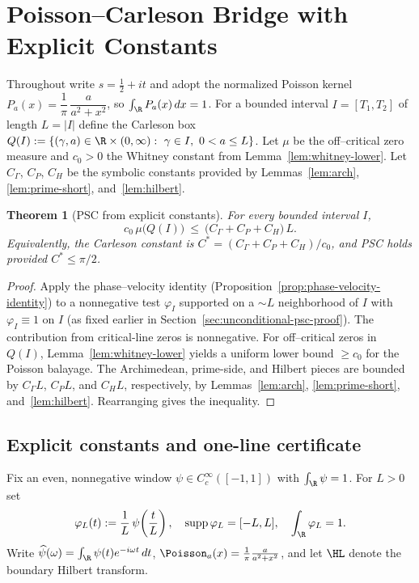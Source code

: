 \documentclass[11pt]{article}
\newtheorem{theorem}{Theorem}
\theoremstyle{remark}
\begin{document}
\section{Poisson--Carleson Bridge with Explicit Constants}\label{sec:pc-bridge}
Throughout write $s=\tfrac12+it$ and adopt the normalized Poisson kernel $P_a(x)=\dfrac{1}{\pi}\,\dfrac{a}{a^2+x^2}$, so $\int_\R P_a(x)\,dx=1$. For a bounded interval $I=[T_1,T_2]$ of length $L=|I|$ define the Carleson box $Q(I):=\{(\gamma,a)\in\R\times(0,\infty):\ \gamma\in I,\ 0<a\le L\}$. Let $\mu$ be the off--critical zero measure and $c_0>0$ the Whitney constant from Lemma~\ref{lem:whitney-lower}. Let $C_\Gamma$, $C_P$, $C_H$ be the symbolic constants provided by Lemmas~\ref{lem:arch}, \ref{lem:prime-short}, and~\ref{lem:hilbert}.

\begin{theorem}[PSC from explicit constants]\label{thm:psc-constants}
For every bounded interval $I$,
\[ c_0\,\mu\big(Q(I)\big)\ \le\ \big(C_\Gamma + C_P + C_H\big)\,L. \]
Equivalently, the Carleson constant is $C^*=(C_\Gamma + C_P + C_H)/c_0$, and PSC holds provided $C^*\le \pi/2$.
\end{theorem}

\begin{proof}
Apply the phase--velocity identity (Proposition~\ref{prop:phase-velocity-identity}) to a nonnegative test $\varphi_I$ supported on a $\sim L$ neighborhood of $I$ with $\varphi_I\equiv 1$ on $I$ (as fixed earlier in Section~\ref{sec:unconditional-psc-proof}). The contribution from critical-line zeros is nonnegative. For off--critical zeros in $Q(I)$, Lemma~\ref{lem:whitney-lower} yields a uniform lower bound $\ge c_0$ for the Poisson balayage. The Archimedean, prime-side, and Hilbert pieces are bounded by $C_\Gamma L$, $C_P L$, and $C_H L$, respectively, by Lemmas~\ref{lem:arch}, \ref{lem:prime-short}, and~\ref{lem:hilbert}. Rearranging gives the inequality.
\end{proof}

\subsection{Explicit constants and one-line certificate}\label{sec:certificate}
Fix an even, nonnegative window $\psi\in C_c^\infty([-1,1])$ with $\int_\R\psi=1$. For $L>0$ set
\[ \varphi_L(t):=\frac{1}{L}\,\psi\!\left(\frac{t}{L}\right),\quad \operatorname{supp}\varphi_L=[-L,L],\quad \int_\R \varphi_L=1. \]
Write $\widehat\psi(\omega)=\int_\R \psi(t)e^{-i\omega t}\,dt$, $\Poisson_a(x)=\tfrac{1}{\pi}\tfrac{a}{a^2+x^2}$, and let $\HL$ denote the boundary Hilbert transform.
\end{document}
